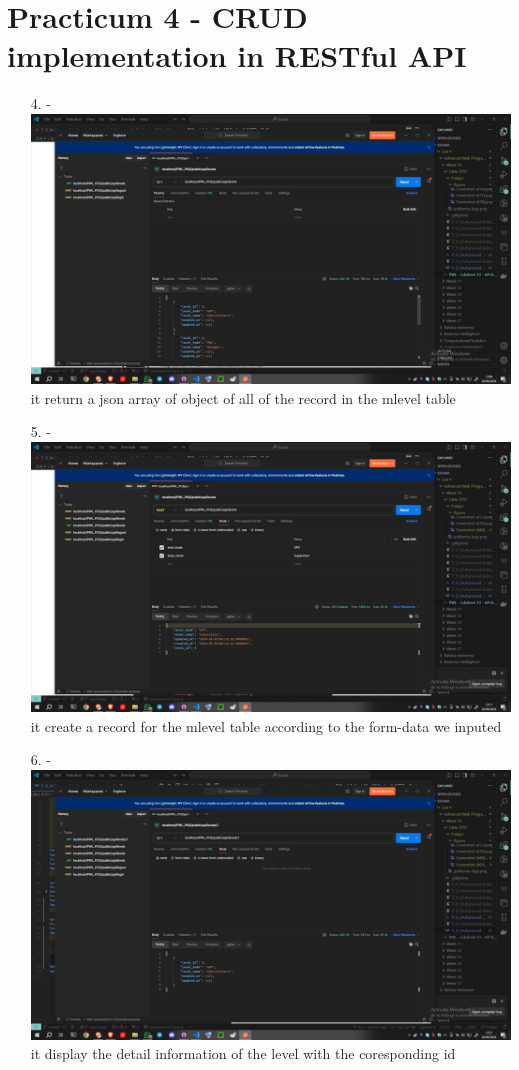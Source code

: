 \documentclass[12pt,titlepage]{article}
\begin{document}
\section{Practicum 4 - CRUD implementation in RESTful API}
\begin{enumerate}
    \item[4.] - \\ \includegraphics[width=.9\textwidth]{images/figures/Screenshot (480).png} \\ it return a json array of object of all of the record in the m\textunderscore level table
    \item[5.] - \\ \includegraphics[width=.9\textwidth]{images/figures/Screenshot (481).png} \\ it create a record for the m\textunderscore level table according to the form-data we inputed
    \item[6.] - \\ \includegraphics[width=.9\textwidth]{images/figures/Screenshot (482).png} \\ it display the detail information of the level with the coresponding id

\end{enumerate}
\end{document}
